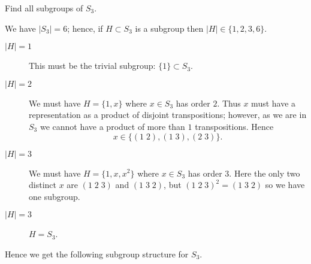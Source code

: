 
\begin{example}
    Find all subgroups of $S_3$.
\end{example}

\begin{solution}
    We have $\lvert S_3 \rvert = 6$; hence,
    if $H \subset S_3$ is a subgroup then
    $\lvert H \rvert \in \{1,2,3,6\}$.
    \begin{description}
        \item[$\lvert H \rvert = 1$]
            This must be the trivial subgroup: $\{1\} \subset S_3$.

        \item[$\lvert H \rvert = 2$]
            We must have $H = \{1,x\}$ where $x\in S_3$ has order $2$.
            Thus $x$ must have a representation as a product of disjoint
            transpositions; however, as we are in $S_3$ we cannot have
            a product of more than $1$ transpositions. Hence
            \[
                x \in \{(1\;2), (1\;3), (2\;3)\}.
            \]
        
        \item[$\lvert H \rvert = 3$]
            We must have $H = \{1, x, x^2\}$ where $x \in S_3$ has order $3$.
            Here the only two distinct $x$ are $(1\;2\;3)$ and $(1\;3\;2)$,
            but $(1\;2\;3)^2 = (1\;3\;2)$ so we have one subgroup.
            
        \item[$\lvert H \rvert = 3$] $H = S_3$.
    \end{description}
    Hence we get the following subgroup structure for $S_3$.
    \begin{center}
    \end{center}
\end{solution}

